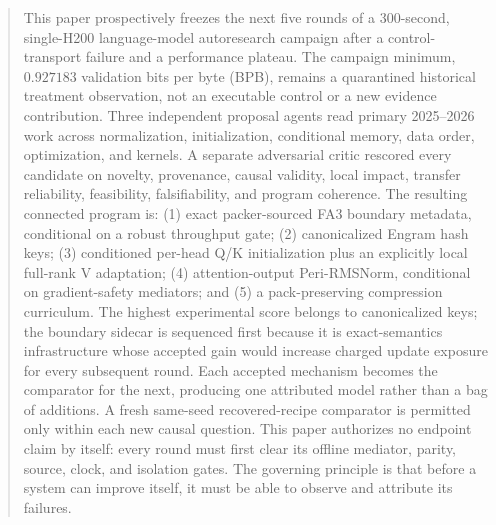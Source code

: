 \documentclass{article}
\begin{document}
\printAffiliationsAndNotice{}

\begin{abstract}
This paper prospectively freezes the next five rounds of a 300-second,
single-H200 language-model autoresearch campaign after a control-transport
failure and a performance plateau.  The campaign minimum, $0.927183$
validation bits per byte (BPB), remains a quarantined historical treatment
observation, not an executable control or a new evidence contribution.
Three independent proposal agents read primary 2025--2026 work across
normalization, initialization, conditional memory, data order, optimization,
and kernels.  A separate adversarial critic rescored every candidate on
novelty, provenance, causal validity, local impact, transfer reliability,
feasibility, falsifiability, and program coherence.  The resulting connected
program is: (1) exact packer-sourced FA3 boundary metadata, conditional on a
robust throughput gate; (2) canonicalized Engram hash keys; (3) conditioned
per-head Q/K initialization plus an explicitly local full-rank V adaptation;
(4) attention-output Peri-RMSNorm, conditional on gradient-safety mediators;
and (5) a pack-preserving compression curriculum.  The highest experimental
score belongs to canonicalized keys; the boundary sidecar is sequenced first
because it is exact-semantics infrastructure whose accepted gain would
increase charged update exposure for every subsequent round.  Each accepted
mechanism becomes the comparator for the next, producing one attributed model
rather than a bag of additions.  A fresh same-seed recovered-recipe
comparator is permitted only within each new causal question.  This paper
authorizes no endpoint claim by itself: every round must first clear its
offline mediator, parity, source, clock, and isolation gates.  The governing
principle is that before a system can improve itself, it must be able to
observe and attribute its failures.
\end{abstract}
\end{document}
